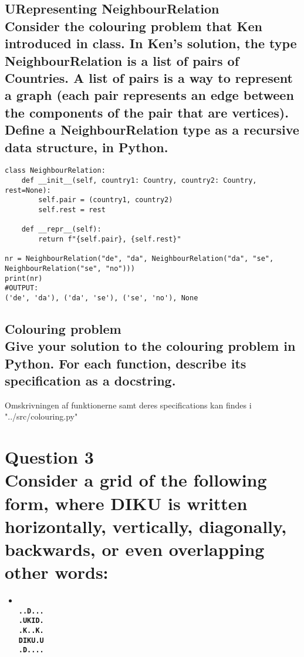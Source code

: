 \documentclass[a4paper,12pt]{article}
\begin{document}
\subsection{URepresenting NeighbourRelation\\
Consider the colouring problem that Ken introduced in class.
In Ken's solution, the type NeighbourRelation is a list of pairs of Countries.
A list of pairs is a way to represent a graph (each pair represents an edge between the components of the pair that are vertices).
Define a NeighbourRelation type as a recursive data structure, in Python.}

\begin{lstlisting}
class NeighbourRelation:
    def __init__(self, country1: Country, country2: Country, rest=None):
        self.pair = (country1, country2)
        self.rest = rest

    def __repr__(self):
        return f"{self.pair}, {self.rest}"
    
nr = NeighbourRelation("de", "da", NeighbourRelation("da", "se", NeighbourRelation("se", "no")))
print(nr)
#OUTPUT:
('de', 'da'), ('da', 'se'), ('se', 'no'), None
\end{lstlisting}

\subsection{Colouring problem\\
Give your solution to the colouring problem in Python. For each function, describe its specification as a docstring.}

Omskrivningen af funktionerne samt deres specifications kan findes i "../src/colouring.py"

\section{Question 3\\
Consider a grid of the following form, where DIKU is written horizontally, vertically, diagonally, backwards, or even overlapping other words:}
\begin{itemize}
    \item[] \textbf{\\
    \lstinline{..D...}\\
    \lstinline{.UKID.}\\
    \lstinline{.K..K.}\\
    \lstinline{DIKU.U}\\
    \lstinline{.D....}}
\end{itemize}
\end{document}

